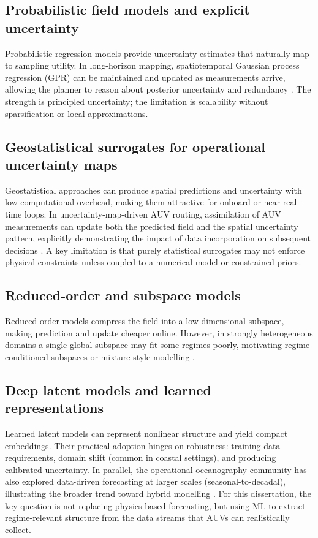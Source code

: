 \subsection{Probabilistic field models and explicit uncertainty}
Probabilistic regression models provide uncertainty estimates that naturally map to sampling utility.
In long-horizon mapping, spatiotemporal Gaussian process regression (GPR) can be maintained and updated as measurements arrive,
allowing the planner to reason about posterior uncertainty and redundancy \parencite{dalfabbro2025douroplume}. The strength is principled
uncertainty; the limitation is scalability without sparsification or local approximations.

\subsection{Geostatistical surrogates for operational uncertainty maps}
Geostatistical approaches can produce spatial predictions and uncertainty with low computational overhead, making them attractive for onboard or near-real-time loops.
In uncertainty-map-driven AUV routing, assimilation of AUV measurements can update both the predicted field and the spatial uncertainty pattern,
explicitly demonstrating the impact of data incorporation on subsequent decisions \parencite{duarte2025geostatistical}. A key limitation is that purely statistical surrogates
may not enforce physical constraints unless coupled to a numerical model or constrained priors.

\subsection{Reduced-order and subspace models}
Reduced-order models compress the field into a low-dimensional subspace, making prediction and update cheaper online.
However, in strongly heterogeneous domains a single global subspace may fit some regimes poorly, motivating regime-conditioned subspaces or mixture-style modelling
\parencite{lermusiaux2007adaptive}.

\subsection{Deep latent models and learned representations}
Learned latent models can represent nonlinear structure and yield compact embeddings.
Their practical adoption hinges on robustness: training data requirements, domain shift (common in coastal settings), and producing calibrated uncertainty.
In parallel, the operational oceanography community has also explored data-driven forecasting at larger scales (seasonal-to-decadal), illustrating the broader trend toward hybrid modelling
\parencite{guo2025orcadl,balaji2022gcmobsolete}. For this dissertation, the key question is not replacing physics-based forecasting, but using ML to extract regime-relevant structure from the data streams that AUVs can realistically collect.

